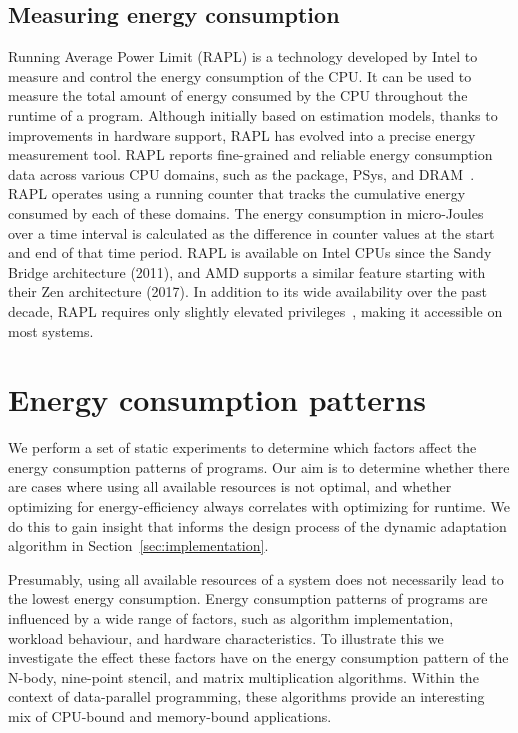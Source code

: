\documentclass[runningheads]{llncs}
\begin{document}
\subsection{Measuring energy consumption}
Running Average Power Limit (RAPL) is a technology developed by Intel to measure and control the energy consumption of the CPU.
It can be used to measure the total amount of energy consumed by the CPU throughout the runtime of a program.
Although initially based on estimation models, thanks to improvements in hardware support, RAPL has evolved into a precise energy measurement tool.
RAPL reports fine-grained and reliable energy consumption data across various CPU domains, such as the package, PSys, and DRAM~\cite{khan2018rapl}.
RAPL operates using a running counter that tracks the cumulative energy consumed by each of these domains.
The energy consumption in micro-Joules over a time interval is calculated as the difference in counter values at the start and end of that time period.
RAPL is available on Intel CPUs since the Sandy Bridge architecture (2011), and AMD supports a similar feature starting with their Zen architecture (2017).
In addition to its wide availability over the past decade, RAPL requires only slightly elevated privileges~\cite{zhang2021red}, making it accessible on most systems.

\section{Energy consumption patterns}\label{sec:observations}
We perform a set of static experiments to determine which factors affect the energy consumption patterns of programs.
Our aim is to determine whether there are cases where using all available resources is not optimal, and whether optimizing for energy-efficiency always correlates with optimizing for runtime.
We do this to gain insight that informs the design process of the dynamic adaptation algorithm in Section~\ref{sec:implementation}.

Presumably, using all available resources of a system does not necessarily lead to the lowest energy consumption.
Energy consumption patterns of programs are influenced by a wide range of factors, such as algorithm implementation, workload behaviour, and hardware characteristics.
To illustrate this we investigate the effect these factors have on the energy consumption pattern of the N-body, nine-point stencil, and matrix multiplication algorithms.
Within the context of data-parallel programming, these algorithms provide an interesting mix of CPU-bound and memory-bound applications.
\end{document}
